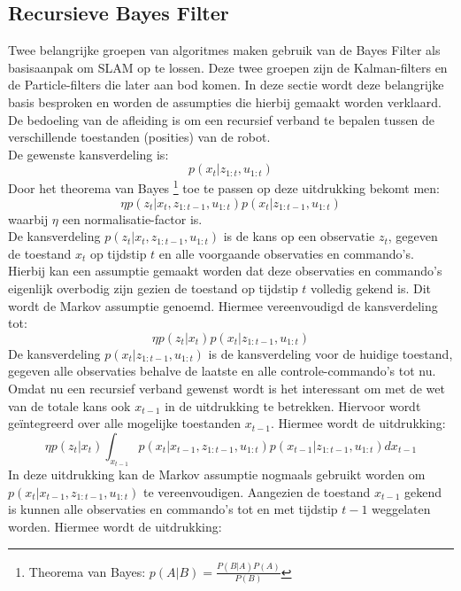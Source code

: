 \documentclass{book}
\begin{document}
\subsection{Recursieve Bayes Filter}\label{bayes}
Twee belangrijke groepen van algoritmes maken gebruik van de Bayes Filter als basisaanpak om SLAM op te lossen. Deze twee groepen zijn de Kalman-filters en de Particle-filters die later aan bod komen. In deze sectie wordt deze belangrijke basis besproken en worden de assumpties die hierbij gemaakt worden verklaard. De bedoeling van de afleiding is om een recursief verband te bepalen tussen de verschillende toestanden (posities) van de robot.\\
De gewenste kansverdeling is:
\begin{equation*}
p(x_t|z_{1:t},u_{1:t})
\end{equation*}
Door het theorema van Bayes \footnote{Theorema van Bayes: $p(A|B) = \frac{P(B|A)P(A)}{P(B)}$} toe te passen op deze uitdrukking bekomt men:
\begin{equation*}
\eta p(z_t|x_{t},z_{1:t-1},u_{1:t})p(x_t|z_{1:t-1},u_{1:t}) 
\end{equation*}
waarbij $\eta$ een normalisatie-factor is.\\
De kansverdeling $ p(z_t|x_{t},z_{1:t-1},u_{1:t})$ is de kans op een observatie $z_t$, gegeven de toestand $x_t$ op tijdstip $t$ en alle voorgaande observaties en commando's. Hierbij kan een assumptie gemaakt worden dat deze observaties en commando's eigenlijk overbodig zijn gezien de toestand op tijdstip $t$ volledig gekend is. Dit wordt de Markov assumptie genoemd. Hiermee vereenvoudigd de kansverdeling tot:
\begin{equation*}
\eta p(z_t|x_t)p(x_t|z_{1:t-1},u_{1:t}) 
\end{equation*}
De kansverdeling $p(x_t|z_{1:t-1},u_{1:t})$ is de kansverdeling voor de huidige toestand, gegeven alle observaties behalve de laatste en alle controle-commando's tot nu. Omdat nu een recursief verband gewenst wordt is het interessant om met de wet van de totale kans ook $x_{t-1}$ in de uitdrukking te betrekken. Hiervoor wordt geïntegreerd over alle mogelijke toestanden $x_{t-1}$. Hiermee wordt de uitdrukking:
\begin{equation*}
\eta p(z_t|x_t)\int_{x_{t-1}}p(x_t|x_{t-1},z_{1:t-1},u_{1:t})p(x_{t-1}|z_{1:t-1},u_{1:t})dx_{t-1}
\end{equation*}
In deze uitdrukking kan de Markov assumptie nogmaals gebruikt worden om $p(x_t|x_{t-1},z_{1:t-1},u_{1:t})$ te vereenvoudigen. Aangezien de toestand $x_{t-1}$ gekend is kunnen alle observaties en commando's tot en met tijdstip $t-1$ weggelaten worden. Hiermee wordt de uitdrukking:
\end{document}
